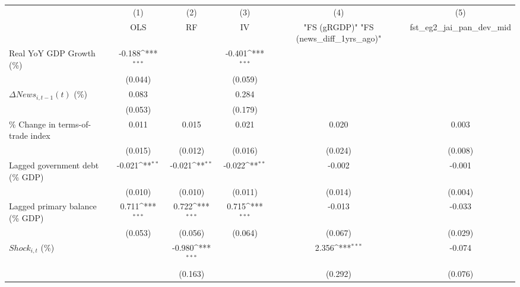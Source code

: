 {
\def\sym#1{\ifmmode^{#1}\else\(^{#1}\)\fi}
\begin{tabular}{l*{5}{c}}
\toprule
                    &\multicolumn{1}{c}{(1)}&\multicolumn{1}{c}{(2)}&\multicolumn{1}{c}{(3)}&\multicolumn{1}{c}{(4)}&\multicolumn{1}{c}{(5)}\\
                    &\multicolumn{1}{c}{OLS}&\multicolumn{1}{c}{RF}&\multicolumn{1}{c}{IV}&\multicolumn{1}{c}{ "FS (gRGDP)"  "FS (news_diff_1yrs_ago)" }&\multicolumn{1}{c}{fst_eg2_jai_pan_dev_mid}\\
\midrule
Real YoY GDP Growth (\%)&      -0.188\sym{***}&                     &      -0.401\sym{***}&                     &                     \\
                    &     (0.044)         &                     &     (0.059)         &                     &                     \\
\addlinespace
$ \Delta News_{i,t-1}(t)$ (\%)&       0.083         &                     &       0.284         &                     &                     \\
                    &     (0.053)         &                     &     (0.179)         &                     &                     \\
\addlinespace
\% Change in terms-of-trade index&       0.011         &       0.015         &       0.021         &       0.020         &       0.003         \\
                    &     (0.015)         &     (0.012)         &     (0.016)         &     (0.024)         &     (0.008)         \\
\addlinespace
Lagged government debt (\% GDP)&      -0.021\sym{**} &      -0.021\sym{**} &      -0.022\sym{**} &      -0.002         &      -0.001         \\
                    &     (0.010)         &     (0.010)         &     (0.011)         &     (0.014)         &     (0.004)         \\
\addlinespace
Lagged primary balance (\% GDP)&       0.711\sym{***}&       0.722\sym{***}&       0.715\sym{***}&      -0.013         &      -0.033         \\
                    &     (0.053)         &     (0.056)         &     (0.064)         &     (0.067)         &     (0.029)         \\
\addlinespace
$ Shock_{i,t}$ (\%) &                     &      -0.980\sym{***}&                     &       2.356\sym{***}&      -0.074         \\
                    &                     &     (0.163)         &                     &     (0.292)         &     (0.076)         \\

\end{tabular}}
